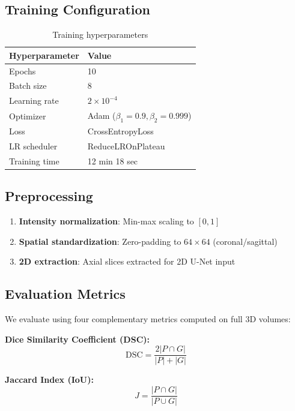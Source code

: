 \documentclass[12pt,a4paper,twocolumn]{article}
\begin{document}
\subsection{Training Configuration}

\begin{table}[H]
\centering
\small
\begin{tabular}{ll}
\toprule
\textbf{Hyperparameter} & \textbf{Value} \\
\midrule
Epochs & 10 \\
Batch size & 8 \\
Learning rate & $2 \times 10^{-4}$ \\
Optimizer & Adam ($\beta_1=0.9, \beta_2=0.999$) \\
Loss & CrossEntropyLoss \\
LR scheduler & ReduceLROnPlateau \\
Training time & 12 min 18 sec \\
\bottomrule
\end{tabular}
\caption{Training hyperparameters}
\end{table}

\subsection{Preprocessing}
\begin{enumerate}[nosep]
    \item \textbf{Intensity normalization}: Min-max scaling to $[0, 1]$
    \item \textbf{Spatial standardization}: Zero-padding to $64 \times 64$ (coronal/sagittal)
    \item \textbf{2D extraction}: Axial slices extracted for 2D U-Net input
\end{enumerate}

\subsection{Evaluation Metrics}

We evaluate using four complementary metrics computed on full 3D volumes:

\textbf{Dice Similarity Coefficient (DSC):}
\begin{equation}
\text{DSC} = \frac{2|P \cap G|}{|P| + |G|}
\end{equation}

\textbf{Jaccard Index (IoU):}
\begin{equation}
J = \frac{|P \cap G|}{|P \cup G|}
\end{equation}
\end{document}
